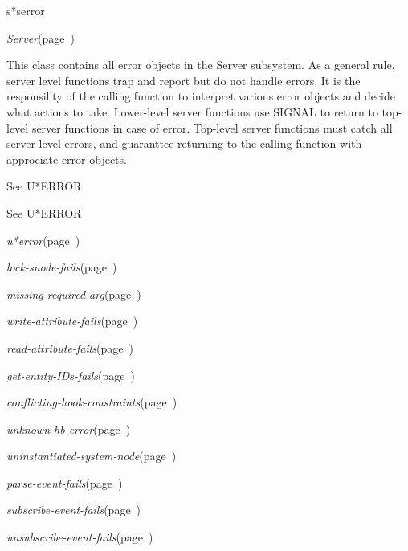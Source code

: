 \begin{description}
\item [Name:]  s*serror

\item [Layer:]
{\sl Server}\hfill(page~\pageref{Server}) 

\item [Description:]
This class contains all error objects in the Server subsystem.
As a general rule, server level functions trap and report but
do not handle errors. It is the responsility of the calling
function to interpret various error objects and decide what
actions to take. Lower-level server functions use SIGNAL to
return to top-level server functions in case of error.
Top-level server functions must catch all server-level errors,
and guaranttee returning to the calling function with
approciate error objects.

\item [Attributes:] See U*ERROR

\item [Operations:] See U*ERROR

\item [Collections:]

\item [Subclasses:]

\item [Superclasses:]
\item {\sl u*error}\hfill(page~\pageref{u*error})

\item [Instances:]
\item {\sl lock-snode-fails}\hfill(page~\pageref{lock-snode-fails})
\item {\sl missing-required-arg}\hfill(page~\pageref{missing-required-arg})
\item {\sl write-attribute-fails}\hfill(page~\pageref{write-attribute-fails})
\item {\sl read-attribute-fails}\hfill(page~\pageref{read-attribute-fails})
\item {\sl get-entity-IDs-fails}\hfill(page~\pageref{get-entity-IDs-fails})
\item {\sl conflicting-hook-constraints}\hfill(page~\pageref{conflicting-hook-constraints})
\item {\sl unknown-hb-error}\hfill(page~\pageref{unknown-hb-error})
\item {\sl uninstantiated-system-node}\hfill(page~\pageref{uninstantiated-system-node})

\item {\sl parse-event-fails}\hfill(page~\pageref{parse-event-fails})
\item {\sl subscribe-event-fails}\hfill(page~\pageref{subscribe-event-fails})
\item {\sl unsubscribe-event-fails}\hfill(page~\pageref{unsubscribe-event-fails})


\end{description}
